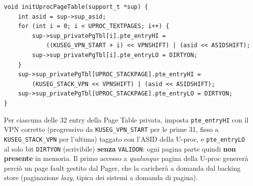 \documentclass[11pt,a4paper]{article}
\newcommand{\code}[1]{\texttt{#1}}
\begin{document}
\begin{lstlisting}
void initUprocPageTable(support_t *sup) {
    int asid = sup->sup_asid;
    for (int i = 0; i < UPROC_TEXTPAGES; i++) {
        sup->sup_privatePgTbl[i].pte_entryHI =
            ((KUSEG_VPN_START + i) << VPNSHIFT) | (asid << ASIDSHIFT);
        sup->sup_privatePgTbl[i].pte_entryLO = DIRTYON;
    }
    sup->sup_privatePgTbl[UPROC_STACKPAGE].pte_entryHI =
        (KUSEG_STACK_VPN << VPNSHIFT) | (asid << ASIDSHIFT);
    sup->sup_privatePgTbl[UPROC_STACKPAGE].pte_entryLO = DIRTYON;
}
\end{lstlisting}
Per ciascuna delle 32 entry della Page Table privata, imposta
\code{pte\_entryHI} con il VPN corretto (progressivo da
\code{KUSEG\_VPN\_START} per le prime 31, fisso a \code{KUSEG\_STACK\_VPN}
per l'ultima) taggato con l'ASID della U-proc, e \code{pte\_entryLO} al solo
bit \code{DIRTYON} (scrivibile) \textbf{senza} \code{VALIDON}: ogni pagina
parte quindi \textbf{non presente} in memoria. Il primo accesso a
\emph{qualunque} pagina della U-proc genererà perciò un page fault gestito
dal Pager, che la caricherà a domanda dal backing store (paginazione
\emph{lazy}, tipica dei sistemi a domanda di pagina).
\end{document}
